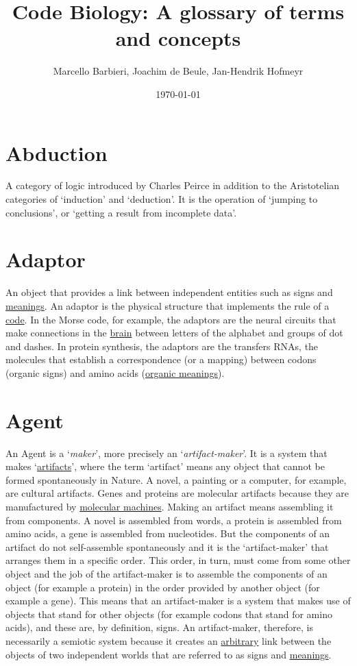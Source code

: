 \documentclass[12pt]{article}
\title{Code Biology: A glossary of terms and concepts}
\author{Marcello Barbieri, Joachim de Beule, Jan-Hendrik Hofmeyr}
\date{\today}
\begin{document}
\maketitle

\setcounter{secnumdepth}{0}
\tableofcontents

\newpage

\hypertarget{abduction}{}
\section{Abduction}
A category of logic introduced by Charles Peirce in addition to the Aristotelian categories of `induction' and `deduction'. It is the operation of `jumping to conclusions', or `getting a result from incomplete data'. 


\hypertarget{adaptor}{}
\section{Adaptor}
An object that provides a link between independent entities such as signs and \hyperlink{meaning}{meanings}. An adaptor is the physical structure that implements the rule of a \hyperlink{code}{code}. In the Morse code, for example, the adaptors are the neural circuits that make connections in the \hyperlink{brain}{brain} between letters of the alphabet and groups of dot and dashes. In protein synthesis, the adaptors are the transfers RNAs, the molecules that establish a correspondence (or a mapping) between codons (organic signs) and amino acids (\hyperlink{organic_meaning}{organic meanings}). 


\hypertarget{agent}{}
\section{Agent}
An Agent is a `\textit{maker}', more precisely an `\textit{artifact-maker}'. It is a system that makes `\hyperlink{artifacts}{artifacts}', where the term `artifact' means any object that cannot be formed spontaneously in Nature. A novel, a painting or a computer, for example, are cultural artifacts. Genes and proteins are molecular artifacts because they are manufactured by \hyperlink{molecular_machines}{molecular machines}. Making an artifact means assembling it from components. A novel is assembled from words, a protein is assembled from amino acids, a gene is assembled from nucleotides. But the components of an artifact do not self-assemble spontaneously and it is the `artifact-maker' that arranges them in a specific order. This order, in turn, must come from some other object and the job of the artifact-maker is to assemble the components of an object (for example a protein) in the order provided by another object (for example a gene). This means that an artifact-maker is a system that makes use of objects that stand for other objects (for example codons that stand for amino acids), and these are, by definition, signs. An artifact-maker, therefore, is necessarily a semiotic system because it creates an \hyperlink{arbitrariness}{arbitrary} link between the objects of two independent worlds that are referred to as signs and \hyperlink{meaning}{meanings}.
\end{document}
